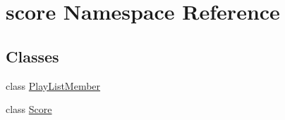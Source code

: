 \hypertarget{namespacescore}{}\section{score Namespace Reference}
\label{namespacescore}
\subsection*{Classes}
\begin{DoxyCompactItemize}
\item 
class \hyperlink{classscore_1_1PlayListMember}{Play\+List\+Member}
\item 
class \hyperlink{classscore_1_1Score}{Score}
\end{DoxyCompactItemize}
